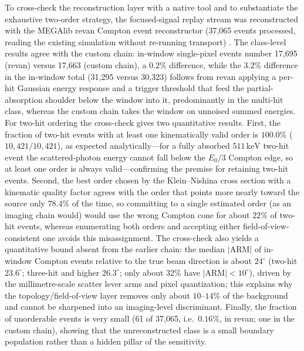 \documentclass[11pt]{article}
\newcommand{\keV}{\ensuremath{\,\mathrm{keV}}}
\begin{document}
To cross-check the reconstruction layer with a native tool and to substantiate
the exhaustive two-order strategy, the focused-signal replay stream was
reconstructed with the MEGAlib revan Compton event reconstructor (37,065 events
processed, reading the existing simulation without re-running transport)
\cite{Zoglauer2006}. The class-level results agree with the custom chain:
in-window single-pixel events number 17,695 (revan) versus 17,663 (custom
chain), a $0.2\%$ difference, while the $3.2\%$ difference in the in-window total
(31,295 versus 30,323) follows from revan applying a per-hit Gaussian energy
response and a trigger threshold that feed the partial-absorption shoulder below
the window into it, predominantly in the multi-hit class, whereas the custom
chain takes the window on unnoised summed energies. For two-hit ordering the
cross-check gives two quantitative results. First, the fraction of two-hit
events with at least one kinematically valid order is $100.0\%$
($10{,}421/10{,}421$), as expected analytically---for a fully absorbed
$511\keV$ two-hit event the scattered-photon energy cannot fall below the
$E_0/3$ Compton edge, so at least one order is always valid---confirming the
premise for retaining two-hit events. Second, the best order chosen by the
Klein--Nishina cross section with a kinematic quality factor agrees with the
order that points more nearly toward the source only $78.4\%$ of the time, so
committing to a single estimated order (as an imaging chain would) would use the
wrong Compton cone for about $22\%$ of two-hit events, whereas enumerating both
orders and accepting either field-of-view-consistent one avoids this
misassignment. The cross-check also yields a quantitative bound absent from the
earlier chain: the median $|\mathrm{ARM}|$ of in-window Compton events relative
to the true beam direction is about $24^\circ$ (two-hit $23.6^\circ$; three-hit
and higher $26.3^\circ$; only about $32\%$ have $|\mathrm{ARM}|<10^\circ$),
driven by the millimetre-scale scatter lever arms and pixel quantization; this
explains why the topology/field-of-view layer removes only about $10$--$14\%$ of
the background and cannot be sharpened into an imaging-level discriminant.
Finally, the fraction of unorderable events is very small (61 of 37,065, i.e.\
$0.16\%$, in revan; one in the custom chain), showing that the unreconstructed
class is a small boundary population rather than a hidden pillar of the
sensitivity.
\end{document}
